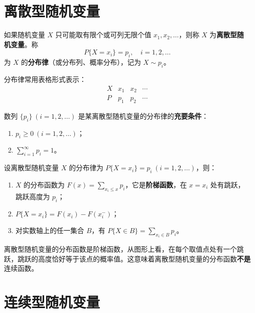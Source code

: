 \documentclass[lang=cn,11pt]{elegantbook}
\begin{document}
\section{离散型随机变量}

\begin{definition}[离散型随机变量] \label{def:discrete-rv}
如果随机变量 $X$ 只可能取有限个或可列无限个值 $x_1, x_2, \dots$，则称 $X$ 为\textbf{离散型随机变量}。称
\[
P\{X = x_i\} = p_i, \quad i = 1, 2, \dots
\]
为 $X$ 的\textbf{分布律}（或分布列、概率分布），记为 $X \sim p_i$。
\end{definition}

分布律常用表格形式表示：
\[
\begin{array}{c|cccc}
X & x_1 & x_2 & \cdots \\
\hline
P & p_1 & p_2 & \cdots
\end{array}
\]

\begin{property}\label{prop:discrete-rv-condition}
数列 $\{p_i\}\ (i=1,2,\dots)$ 是某离散型随机变量的分布律的\textbf{充要条件}：
\begin{enumerate}
    \item $p_i \ge 0\ (i = 1, 2, \dots)$；
    \item $\displaystyle\sum_{i=1}^{\infty} p_i = 1$。
\end{enumerate}
\end{property}

\begin{property}\label{prop:discrete-rv-df}
设离散型随机变量 $X$ 的分布律为 $P\{X = x_i\} = p_i\ (i=1,2,\dots)$，则：
\begin{enumerate}
    \item $X$ 的分布函数为 $\displaystyle F(x) = \sum_{x_i \le x} p_i$，它是\textbf{阶梯函数}，在 $x = x_i$ 处有跳跃，跳跃高度为 $p_i$；
    \item $P\{X = x_i\} = F(x_i) - F(x_i^-)$；
    \item 对实数轴上的任一集合 $B$，有 $\displaystyle P\{X \in B\} = \sum_{x_i \in B} p_i$。
\end{enumerate}
\end{property}

\begin{note}
离散型随机变量的分布函数是阶梯函数，从图形上看，在每个取值点处有一个跳跃，跳跃的高度恰好等于该点的概率值。这意味着离散型随机变量的分布函数\textbf{不是}连续函数。
\end{note}

\section{连续型随机变量}
\end{document}
